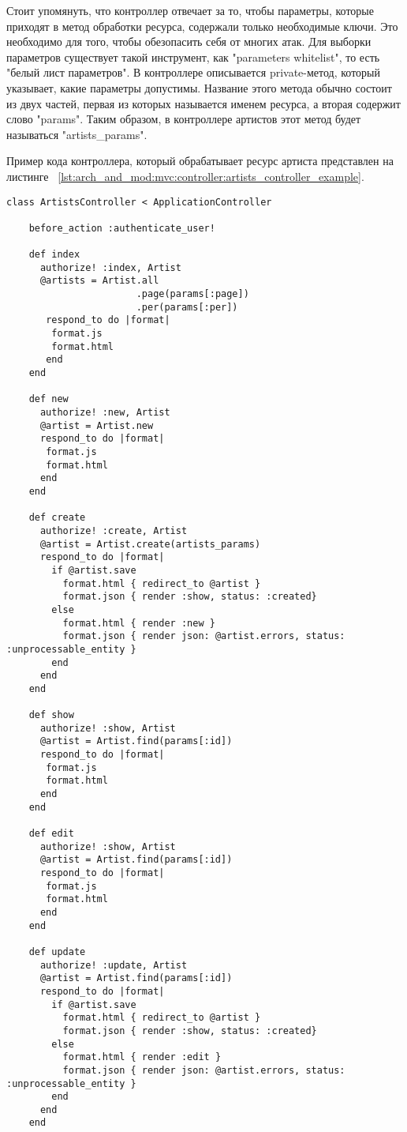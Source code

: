 Стоит упомянуть, что контроллер отвечает за то, чтобы параметры, которые приходят в метод обработки ресурса, содержали только необходимые ключи. Это необходимо для того, чтобы обезопасить себя от многих атак. Для выборки параметров существует такой инструмент, как "parameters whitelist", то есть "белый лист параметров". В контроллере описывается private-метод, который указывает, какие параметры допустимы. Название этого метода обычно состоит из двух частей, первая из которых называется именем ресурса, а вторая содержит слово "params". Таким образом, в контроллере артистов этот метод будет называться "artists\_params".

Пример кода контроллера, который обрабатывает ресурс артиста представлен на листинге ~\ref{lst:arch_and_mod:mvc:controller:artists_controller_example}.

\begin{lstlisting}[style=fsharpstyle,caption={Пример получения артистов по определённым параметрам}, label=lst:arch_and_mod:mvc:controller:artists_controller_example]
  class ArtistsController < ApplicationController

    before_action :authenticate_user!

    def index
      authorize! :index, Artist
      @artists = Artist.all
                       .page(params[:page])
                       .per(params[:per])
       respond_to do |format|
        format.js
        format.html
       end
    end

    def new
      authorize! :new, Artist
      @artist = Artist.new
      respond_to do |format|
       format.js
       format.html
      end
    end

    def create
      authorize! :create, Artist
      @artist = Artist.create(artists_params)
      respond_to do |format|
        if @artist.save
          format.html { redirect_to @artist }
          format.json { render :show, status: :created}
        else
          format.html { render :new }
          format.json { render json: @artist.errors, status: :unprocessable_entity }
        end
      end
    end

    def show
      authorize! :show, Artist
      @artist = Artist.find(params[:id])
      respond_to do |format|
       format.js
       format.html
      end
    end

    def edit
      authorize! :show, Artist
      @artist = Artist.find(params[:id])
      respond_to do |format|
       format.js
       format.html
      end
    end

    def update
      authorize! :update, Artist
      @artist = Artist.find(params[:id])
      respond_to do |format|
        if @artist.save
          format.html { redirect_to @artist }
          format.json { render :show, status: :created}
        else
          format.html { render :edit }
          format.json { render json: @artist.errors, status: :unprocessable_entity }
        end
      end
    end


\end{lstlisting}
